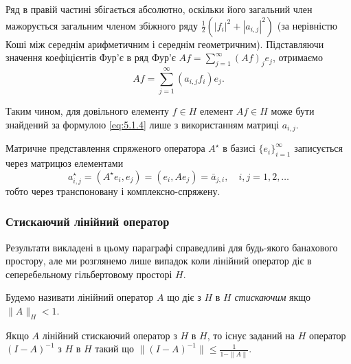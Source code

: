 Ряд в правій частині збігається абсолютно, оскільки його загальний член мажорується загальним членом збіжного ряду $\frac{1}{2} (|f_i|^2 + |a_{i,j}|^2)$ (за нерівністю Коші між середнім арифметичним і середнім геометричним). Підставляючи
значення коефіцієнтів Фур'є в ряд Фур'є $A f = \sum_{j = 1}^\infty (A f)_j e_j$, отримаємо
\begin{equation}
    \label{eq:5.1.4}
    A f = \sum_{j = 1}^\infty \left( a_{i,j} f_i \right) e_j.
\end{equation}

Таким чином, для довільного елементу $f \in H$ елемент $A f \in H$ може бути знайдений за формулою \eqref{eq:5.1.4} лише з використанням матриці $a_{i, j}$.

\begin{proposition}
    Матричне представлення спряженого оператора $A^\star$ в базисі $\{e_i\}_{i = 1}^\infty$ записується через матрицюз елементами
    \begin{equation*}
        a_{i, j}^\star = (A^\star e_i, e_j) = (e_i, A e_j) = \bar a_{j, i}, \quad i, j = 1, 2, \ldots
    \end{equation*}
    тобто через транспоновану і комплексно-спряжену.
\end{proposition}

\subsubsection{Стискаючий лінійний оператор}

Результати викладені в цьому параграфі справедливі для будь-якого банахового простору, але ми розглянемо лише випадок коли лінійний оператор діє в сеперебельному гільбертовому просторі $H$. 

\begin{definition}
    Будемо називати лінійний оператор $A$ що діє з $H$ в $H$ \emph{стискаючим} якщо $\|A\|_H < 1$.
\end{definition}

\begin{lemma}
    Якщо $A$ лінійний стискаючий оператор з $H$ в $H$, то існує заданий на $H$ оператор $(I - A)^{-1}$ з $H$ в $H$ такий що $\|(I - A)^{-1} \| \le \frac{1}{1 - \|A\|}$.
\end{lemma}

